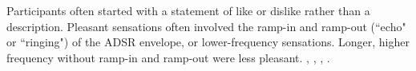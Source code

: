 Participants often started with a statement of like or dislike rather than a description.
Pleasant sensations often involved the
ramp-in and ramp-out (``echo" or ``ringing") of the ADSR envelope, or lower-frequency sensations.
Longer, higher frequency without ramp-in and ramp-out were less pleasant.
	,
	, ,
	.


